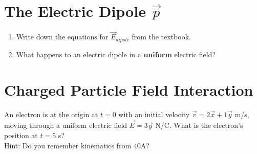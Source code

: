 \documentclass{article}
\begin{document}
\section{The Electric Dipole $\vec{p}$} 

\begin{enumerate}[label=(\alph*)]
	\item Write down the equations for $\vec{E}_{dipole}$ from the textbook.
	
	\item What happens to an electric dipole in a {\bfseries uniform} electric field?
	
\end{enumerate}


\section{Charged Particle Field Interaction}

An electron is at the origin at $t = 0$ with an initial velocity $\vec{v} = 2\vec{x} + 1\vec{y}$ m/s, moving through a uniform electric field $\vec{E} = 3\vec{y}$ N/C. What is the electron's position at $t = 5$ s?
\\

\noindent 
Hint: Do you remember kinematics from 40A?
\end{document}
